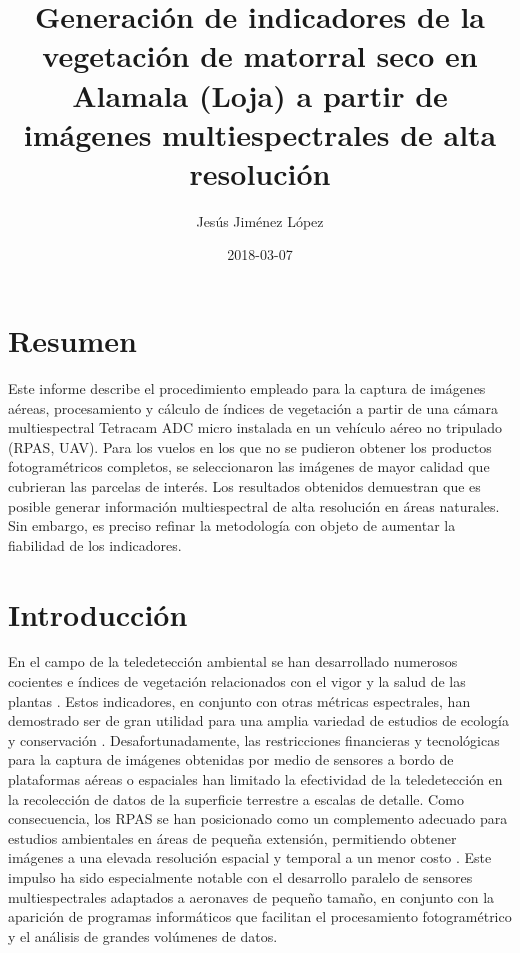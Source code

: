 \documentclass[spanish,openany]{article}
\title{Generación de indicadores de la vegetación de matorral seco en Alamala
(Loja) a partir de imágenes multiespectrales de alta resolución}
\author{Jesús Jiménez López}
\date{2018-03-07}
\begin{document}
\maketitle

{
\setcounter{tocdepth}{2}
\tableofcontents
}
\section*{Resumen}\label{resumen}

Este informe describe el procedimiento empleado para la captura de
imágenes aéreas, procesamiento y cálculo de índices de vegetación a
partir de una cámara multiespectral Tetracam ADC micro instalada en un
vehículo aéreo no tripulado (RPAS, UAV). Para los vuelos en los que no
se pudieron obtener los productos fotogramétricos completos, se
seleccionaron las imágenes de mayor calidad que cubrieran las parcelas
de interés. Los resultados obtenidos demuestran que es posible generar
información multiespectral de alta resolución en áreas naturales. Sin
embargo, es preciso refinar la metodología con objeto de aumentar la
fiabilidad de los indicadores.

\section{Introducción}\label{intro}

En el campo de la teledetección ambiental se han desarrollado numerosos
cocientes e índices de vegetación relacionados con el vigor y la salud
de las plantas \citep{Bannari1995}. Estos indicadores, en conjunto con
otras métricas espectrales, han demostrado ser de gran utilidad para una
amplia variedad de estudios de ecología y conservación \citep{Wang2010}.
Desafortunadamente, las restricciones financieras y tecnológicas para la
captura de imágenes obtenidas por medio de sensores a bordo de
plataformas aéreas o espaciales han limitado la efectividad de la
teledetección en la recolección de datos de la superficie terrestre a
escalas de detalle. Como consecuencia, los RPAS se han posicionado como
un complemento adecuado para estudios ambientales en áreas de pequeña
extensión, permitiendo obtener imágenes a una elevada resolución
espacial y temporal a un menor costo \citep{Koh2012}. Este impulso ha
sido especialmente notable con el desarrollo paralelo de sensores
multiespectrales adaptados a aeronaves de pequeño tamaño, en conjunto
con la aparición de programas informáticos que facilitan el
procesamiento fotogramétrico y el análisis de grandes volúmenes de
datos.
\end{document}
